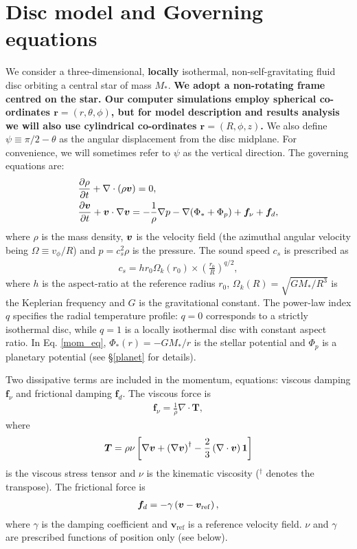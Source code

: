 \section{Disc model and Governing equations}\label{model} 
We consider a three-dimensional, {\bf locally} isothermal,
non-self-gravitating fluid disc orbiting a central 
star of mass $M_*$. {\bf We adopt a non-rotating frame centred on the
  star. Our computer simulations employ spherical co-ordinates
  $\bm{r}=(r,\theta,\phi)$, but for model description and results 
  analysis we will also use cylindrical co-ordinates $\bm{r}=(R, \phi,
  z)$.} We also define $\psi \equiv \pi/2 -
\theta$ as the angular displacement from the disc midplane. For
convenience, we will sometimes refer to $\psi$ as the vertical
direction. The governing equations are: 
\begin{align}
  &\frac{\partial\rho}{\partial t} + \nabla\cdot\left(\rho\bm{v}\right) =
  0,\label{cont_eq}\\ 
  &\frac{\partial\bm{v}}{\partial t} + \bm{v}\cdot\nabla\bm{v} = -\frac{1}{\rho}\nabla
  p -\nabla{\left(\Phi_*+\Phi_p\right)} +\bm{f}_\nu + \bm{f}_d\label{mom_eq},    
\end{align}
where $\rho$ is the mass density, $\bm{v}$ is the velocity field (the
azimuthal angular velocity being $\Omega\equiv v_\phi/R$) and 
$p=c_s^2\rho$ is the pressure. 
The sound speed $c_s$ is prescribed as 
\begin{align}
  c_s = hr_0\Omega_k(r_0)\times\left(\frac{r_0}{R}\right)^{q/2}, 
\end{align}
where $h$ is the aspect-ratio at the reference radius $r_0$, 
$\Omega_k(R) = \sqrt{GM_*/R^3}$ is the Keplerian frequency and $G$ is
the gravitational constant. The power-law index $q$ specifies the
radial temperature profile: $q=0$ corresponds to a strictly isothermal
disc, while $q=1$ is a locally isothermal disc with constant aspect
ratio. In Eq. \ref{mom_eq}, $\Phi_*(r) = -GM_*/r $ is the stellar
potential and $\Phi_p$ is a planetary potential (see \S\ref{planet}
for details).  

Two dissipative terms are included in the momentum, equations: viscous
damping $\bm{f}_\nu$ and frictional damping $\bm{f}_d$. The viscous
force is 
\begin{align}
  \bm{f}_\nu = \frac{1}{\rho}\nabla\cdot\bm{T},
\end{align}
where 
\begin{align}
  \bm{T} = \rho\nu \left[\nabla\bm{v} + \left(\nabla\bm{v}\right)^\dagger
    - \frac{2}{3}\left(\nabla\cdot\bm{v}\right)\bm{1} \right]
\end{align}
is the viscous stress tensor and $\nu$ is the kinematic viscosity 
($^\dagger$ denotes the transpose). The frictional force is 
\begin{align}
  \bm{f}_d = -\gamma\left(\bm{v} - \bm{v}_\mathrm{ref}\right),
\end{align}
where $\gamma$ is the damping coefficient and
$\bm{v}_\mathrm{ref}$ is a reference velocity field. 
$\nu$ and $\gamma$ are prescribed functions of position only (see
below). %

